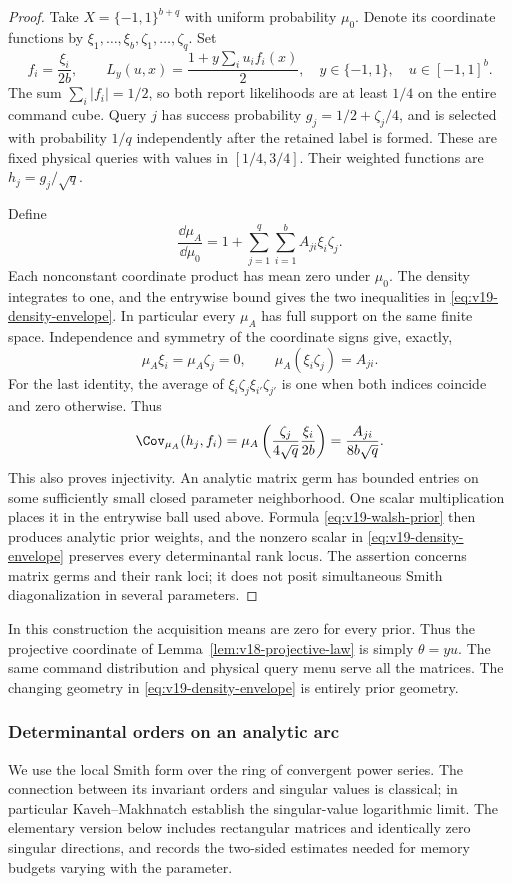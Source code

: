 \begin{proof}
Take $X=\{-1,1\}^{b+q}$ with uniform probability $\mu_0$. Denote
its coordinate functions by $\xi_1,\ldots,\xi_b,\zeta_1,\ldots,\zeta_q$.
Set
\[
 f_i=\frac{\xi_i}{2b},\qquad
 L_y(u,x)=\frac{1+y\sum_i u_i f_i(x)}2,
 \quad y\in\{-1,1\},\quad u\in[-1,1]^b.
\]
The sum $\sum_i|f_i|=1/2$, so both report likelihoods are at least
$1/4$ on the entire command cube. Query $j$ has success probability
$g_j=1/2+\zeta_j/4$, and is selected with probability $1/q$
independently after the retained label is formed. These are fixed
physical queries with values in $[1/4,3/4]$. Their weighted functions
are $h_j=g_j/\sqrt q$.

Define
\begin{equation}\label{eq:v19-walsh-prior}
 \frac{\dd\mu_A}{\dd\mu_0}
       =1+\sum_{j=1}^q\sum_{i=1}^b A_{ji}\xi_i\zeta_j.
\end{equation}
Each nonconstant coordinate product has mean zero under $\mu_0$.
The density integrates to one, and the entrywise bound gives the two
inequalities in \eqref{eq:v19-density-envelope}. In particular every
$\mu_A$ has full support on the same finite space. Independence and
symmetry of the coordinate signs give, exactly,
\[
 \mu_A\xi_i=\mu_A\zeta_j=0,\qquad
 \mu_A(\xi_i\zeta_j)=A_{ji}.
\]
For the last identity, the average of
$\xi_i\zeta_j\xi_{i'}\zeta_{j'}$ is one when both indices coincide
and zero otherwise. Thus
\[
 \Cov_{\mu_A}(h_j,f_i)
   =\mu_A\left(\frac{\zeta_j}{4\sqrt q}
                       \frac{\xi_i}{2b}\right)
   =\frac{A_{ji}}{8b\sqrt q}.
\]
This also proves injectivity. An analytic matrix germ has bounded
entries on some sufficiently small closed parameter neighborhood.
One scalar multiplication places it in the entrywise ball used above.
Formula \eqref{eq:v19-walsh-prior} then produces analytic prior
weights, and the nonzero scalar in \eqref{eq:v19-density-envelope}
preserves every determinantal rank locus. The assertion concerns
matrix germs and their rank loci; it does not posit simultaneous
Smith diagonalization in several parameters.
\end{proof}

In this construction the acquisition means are zero for every prior.
Thus the projective coordinate of Lemma~\ref{lem:v18-projective-law}
is simply $\theta=yu$. The same command distribution and physical
query menu serve all the matrices. The changing geometry in
\eqref{eq:v19-density-envelope} is entirely prior geometry.

\subsubsection{Determinantal orders on an analytic arc}
We use the local Smith form over the ring of convergent power series.
The connection between its invariant orders and singular values is
classical; in particular Kaveh--Makhnatch
\cite[Theorem 1.1 and Section 6]{KavehMakhnatch} establish the
singular-value logarithmic limit. The elementary version below includes
rectangular matrices and identically zero singular directions, and
records the two-sided estimates needed for memory budgets varying
with the parameter.

